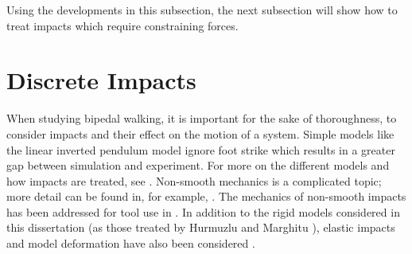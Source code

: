 Using the developments in this subsection, the next subsection will show how to treat
impacts which require constraining forces.


\section{Discrete Impacts}

When studying bipedal walking, it is important for the sake of thoroughness, to
consider impacts and their effect on the motion of a system.
%
Simple models like the linear inverted pendulum model ignore foot strike which
results in a greater gap between simulation and experiment.
%
For more on the different models and how impacts are treated, see
.
%
Non-smooth mechanics is a complicated topic; more detail can be found in, for
example, \cite{Brogliato1996, Kozlov1991}.
%
The mechanics of non-smooth impacts has been addressed for tool use in
\cite{Gorinevsky1997, Siciliano1999}.
%
In addition to the rigid models considered in this dissertation (as those
treated by Hurmuzlu and Marghitu \cite{Hurmuzlu1994}), elastic impacts and model
deformation have also been considered \cite{Chapnik1991, Wei1993}.

